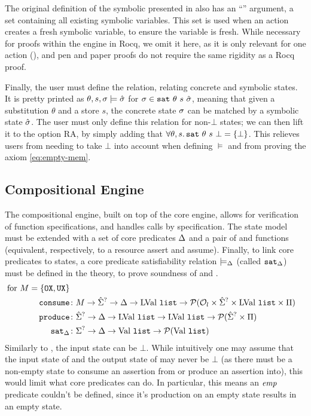 The original definition of the symbolic \execac{} presented in \cite{cse2} also has an ``\SV'' argument, a set containing all existing symbolic variables. This set is used when an action creates a fresh symbolic variable, to ensure the variable is fresh. While necessary for proofs within the engine in Rocq, we omit it here, as it is only relevant for one action (\alloc), and pen and paper proofs do not require the same rigidity as a Rocq proof.

Finally, the user must define the  relation, relating concrete and symbolic states. It is pretty printed as $\theta,s,\sigma\models \hat{\sigma}$ for $\sigma\in\texttt{sat}~\theta~s~\hat{\sigma}$, meaning that given a substitution $\theta$ and a store $s$, the concrete state $\sigma$ can be matched by a symbolic state $\hat{\sigma}$. The user must only define this relation for non-$\bot$ states; we can then lift it to the option RA, by simply adding that $\forall \theta, s\ldotp \texttt{sat}~\theta~s~\bot=\{\bot\}$. This relieves users from needing to take $\bot$ into account when defining $\models$ and from proving the axiom \ref{eq:empty-mem}.

\subsection{Compositional Engine}

The compositional engine, built on top of the core engine, allows for verification of function specifications, and handles calls by specification. The state model must be extended with a set of core predicates $\Delta$ and a pair of \consume{} and \produce{} functions (equivalent, respectively, to a resource assert and assume). Finally, to link core predicates to states, a core predicate satisfiability relation $\models_{\Delta}$ (called $\texttt{sat}_{\Delta}$) must be defined in the theory, to prove soundness of \consume{} and \produce.
\begin{align*}
	\text{for }M=\{\texttt{OX}, \texttt{UX}\}\\
	\texttt{consume} &\colon M\rightarrow \hat{\Sigma}^? \rightarrow \Delta \rightarrow \text{LVal}~\texttt{list} \rightarrow {\cal P}({\cal O}_l \times \hat{\Sigma}^? \times \text{LVal}~\texttt{list} \times \Pi) \\
	\texttt{produce} &\colon \hat{\Sigma}^? \rightarrow \Delta \rightarrow \text{LVal}~\texttt{list} \rightarrow \text{LVal}~\texttt{list} \rightarrow {\cal P}(\hat{\Sigma}^? \times \Pi)\\
	\texttt{sat}_\Delta &\colon\Sigma^? \rightarrow \Delta \rightarrow \text{Val}~\texttt{list} \rightarrow {\cal P}(\text{Val}~\texttt{list})
\end{align*}
Similarly to \execac, the input state can be $\bot$. While intuitively one may assume that the input state of \consume{} and the output state of \produce{} may never be $\bot$ (as there must be a non-empty state to consume an assertion from or produce an assertion into), this would limit what core predicates can do. In particular, this means an $\textit{emp}$ predicate couldn't be defined, since it's production on an empty state results in an empty state.

